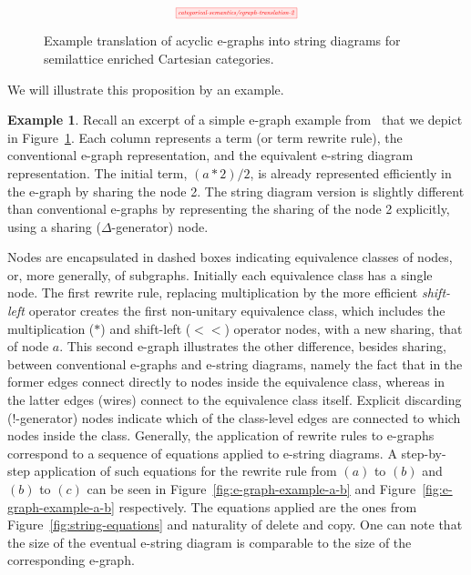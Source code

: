 \documentclass[sigconf, 9pt, nonacm]{acmart}
\theoremstyle{definition}
\newtheorem{example}[thm]{Example}
\begin{document}
\begin{figure}
    \[
        \scalebox{0.5}{
        \tikzfig{categorical-semantics/egraph-translation-2}
        }
    \]
    \caption{Example translation of acyclic e-graphs into string diagrams for semilattice enriched Cartesian categories. }
    \label{fig:e-graph-example}
\end{figure}

We will illustrate this proposition by an example.
\begin{example}
    Recall an excerpt of a simple e-graph example from~\cite{EggPaper} that we depict in Figure~\ref{fig:e-graph-example}.
    Each column represents a term (or term rewrite rule), the conventional e-graph representation, and the equivalent e-string diagram representation. 
The initial term, $(a*2)/2$, is already represented efficiently in the e-graph by sharing the node 2.
The string diagram version is slightly different than conventional e-graphs by representing the sharing of the node 2 explicitly, using a sharing ($\Delta$-generator) node. 

Nodes are encapsulated in dashed boxes indicating equivalence classes of nodes, or, more generally, of subgraphs. 
Initially each equivalence class has a single node. 
The first rewrite rule, replacing multiplication by the more efficient \emph{shift-left} operator creates the first non-unitary equivalence class, which includes the multiplication ($*$) and shift-left ($<\!\!<$) operator nodes, with a new sharing, that of node $a$. 
This second e-graph illustrates the other difference, besides sharing, between conventional e-graphs and e-string diagrams, namely the fact that in the former edges connect directly to nodes inside the equivalence class, whereas in the latter edges (wires) connect to the equivalence class itself. 
Explicit discarding ($!$-generator) nodes indicate which of the class-level edges are connected to which nodes inside the class. 
Generally, the application of rewrite rules to e-graphs correspond to a sequence of equations applied to e-string diagrams.
A step-by-step application of such equations for the rewrite rule from $(a)$ to $(b)$ and $(b)$ to $(c)$ can be seen in Figure~\ref{fig:e-graph-example-a-b} and Figure~\ref{fig:e-graph-example-a-b} respectively.
The equations applied are the ones from Figure~\ref{fig:string-equations} and naturality of delete and copy.
One can note that the size of the eventual e-string diagram is comparable to the size of the corresponding e-graph.
\end{example}
\end{document}
